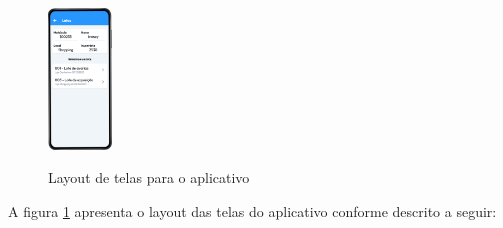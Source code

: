 \begin{figure}[!htb]
{        \includegraphics[width=0.15\textwidth]{imgs/lote.png}
    }
    \quad
    \caption{Layout de telas para o aplicativo}
    \label{fig:telas}
\end{figure}

A figura \ref{fig:telas} apresenta o layout das telas do aplicativo conforme descrito a seguir:

